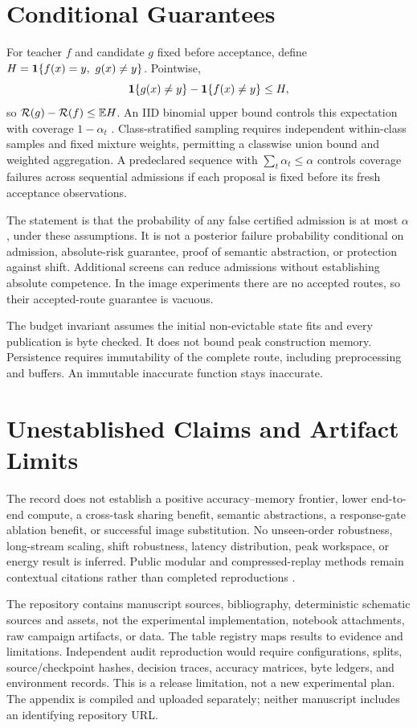 \documentclass{article}
\begin{document}
\section{Conditional Guarantees}
For teacher $f$ and candidate $g$ fixed before acceptance, define $H=\mathbf{1}\{f(x)=y,\ g(x)\ne y\}$. Pointwise,
\[
\mathbf{1}\{g(x)\ne y\}-\mathbf{1}\{f(x)\ne y\}\le H,
\]
so $\mathcal{R}(g)-\mathcal{R}(f)\le\mathbb{E} H$. An IID binomial upper bound controls this expectation with coverage $1-\alpha_t$ \cite{clopper1934}. Class-stratified sampling requires independent within-class samples and fixed mixture weights, permitting a classwise union bound and weighted aggregation. A predeclared sequence with $\sum_t\alpha_t\le\alpha$ controls coverage failures across sequential admissions if each proposal is fixed before its fresh acceptance observations.

The statement is that the probability of any false certified admission is at most $\alpha$, under these assumptions. It is not a posterior failure probability conditional on admission, absolute-risk guarantee, proof of semantic abstraction, or protection against shift. Additional screens can reduce admissions without establishing absolute competence. In the image experiments there are no accepted routes, so their accepted-route guarantee is vacuous.

The budget invariant assumes the initial non-evictable state fits and every publication is byte checked. It does not bound peak construction memory. Persistence requires immutability of the complete route, including preprocessing and buffers. An immutable inaccurate function stays inaccurate.

\section{Unestablished Claims and Artifact Limits}
The record does not establish a positive accuracy--memory frontier, lower end-to-end compute, a cross-task sharing benefit, semantic abstractions, a response-gate ablation benefit, or successful image substitution. No unseen-order robustness, long-stream scaling, shift robustness, latency distribution, peak workspace, or energy result is inferred. Public modular and compressed-replay methods remain contextual citations rather than completed reproductions \cite{mendez2021,veniat2021,hayes2020,pellegrini2019,nori2025}.

The repository contains manuscript sources, bibliography, deterministic schematic sources and assets, not the experimental implementation, notebook attachments, raw campaign artifacts, or data. The table registry maps results to evidence and limitations. Independent audit reproduction would require configurations, splits, source/checkpoint hashes, decision traces, accuracy matrices, byte ledgers, and environment records. This is a release limitation, not a new experimental plan. The appendix is compiled and uploaded separately; neither manuscript includes an identifying repository URL.
\end{document}
